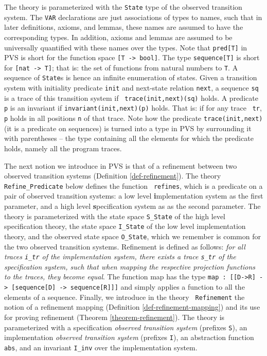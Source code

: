 The theory is parameterized with the  {\tt State} type of the observed
transition system. The {\tt VAR} declarations are just associations of
types  to names,  such that in  later definitions,  axioms, and lemmas,
these names are assumed to have the corresponding types.  In addition,
axioms and lemmas are assumed to  be universally quantified with these
names over the types.  Note that {\tt pred[T]} in PVS is short for the
function  space {\tt  [T  -> bool]}\@. The   type {\tt sequence[T]} is
short for {\tt [nat -> T]}; that is: the set of functions from natural
numbers to {\tt T}\@.    A  sequence of  {\tt   State}s is hence   an
infinite  enumeration  of  states.   Given  a  transition  system with
initiality predicate {\tt init} and  next-state relation {\tt next}, a
sequence {\tt  sq}   is a trace  of  this  transition system  if  {\tt
  trace(init,next)(sq)} holds. A predicate {\tt p}  is an invariant if
{\tt  invariant(init,next)(p)} holds. That is: if   for any trace {\tt
  tr}, {\tt p} holds in all positions {\tt n} of that trace.  Note how
the predicate {\tt trace(init,next)} (it is  a predicate on sequences)
is  turned into a type in  PVS by surrounding  it with parentheses -- the
type containing all the elements for which the predicate holds, namely
all the program traces.

The next notion  we introduce in PVS  is that of  a refinement between
two observed transition   systems  (Definition \ref{def-refinement})\@.  
The theory   {\tt Refine\_Predicate} below  defines  the function {\tt
  refines}, which is   a predicate on   a pair of  observed transition
systems:   a  low  level  {\bf i}mplementation    system as the  first
parameter,  and   a high level  {\bf  s}pecification  system as as the
second parameter.   The theory is parameterized  with  the state space
{\tt S\_State} of the high level specification theory, the state space
{\tt  I\_State}  of  the low   level implementation  theory,   and the
observed  state space {\tt O\_State},  which we remember is common for
the two observed transition systems. Refinement is defined as follows:
{\em for all  traces {\tt i\_tr}  of the implementation  system, there
  exists  a trace {\tt  s\_tr} of the  specification system, such that
  when mapping the respective projection functions to the traces, they
  become equal}\@. The function map  has the type {\tt  map : [[D->R] ->
  [sequence[D] -> sequence[R]]]} and simply  applies a function to all
the elements of a sequence.  Finally, we introduce  in the theory {\tt
  Refinement} the  notion     of a  refinement   mapping   (Definition
\ref{def-refinement-mapping})  and  its  use  for  proving refinement
(Theorem \ref{theorem-refinement})\@.   The theory is parameterized with
a specification {\em observed  transition system} (prefixes  {\tt S}),
an implementation {\em observed transition system} (prefixes {\tt I}),
an abstraction function {\tt abs}, and  an invariant {\tt I\_inv} over
the implementation system.

